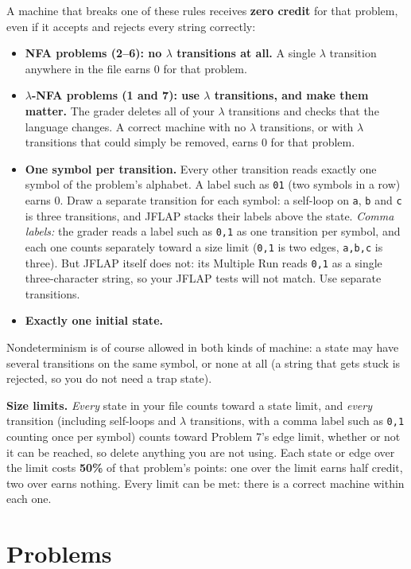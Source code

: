 \documentclass[11pt]{article}
\begin{document}
A machine that breaks one of these rules receives \textbf{zero credit} for that problem, even if
it accepts and rejects every string correctly:
\begin{itemize}
  \item \textbf{NFA problems (2--6): no $\lambda$ transitions at all.} A single $\lambda$
        transition anywhere in the file earns 0 for that problem.
  \item \textbf{$\lambda$-NFA problems (1 and 7): use $\lambda$ transitions, and make them
        matter.} The grader deletes all of your $\lambda$ transitions and checks that the
        language changes. A correct machine with no $\lambda$ transitions, or with $\lambda$
        transitions that could simply be removed, earns 0 for that problem.
  \item \textbf{One symbol per transition.} Every other transition reads exactly one symbol of
        the problem's alphabet. A label such as \texttt{01} (two symbols in a row) earns 0.
        Draw a separate transition for each symbol: a self-loop on \texttt{a}, \texttt{b} and
        \texttt{c} is three transitions, and JFLAP stacks their labels above the state.
        \emph{Comma labels:} the grader reads a label such as \texttt{0,1} as one transition
        per symbol, and each one counts separately toward a size limit (\texttt{0,1} is two
        edges, \texttt{a,b,c} is three). But JFLAP itself does not: its Multiple Run reads
        \texttt{0,1} as a single three-character string, so your JFLAP tests will not match.
        Use separate transitions.
  \item \textbf{Exactly one initial state.}
\end{itemize}
Nondeterminism is of course allowed in both kinds of machine: a state may have several
transitions on the same symbol, or none at all (a string that gets stuck is rejected, so you do
not need a trap state).

\textbf{Size limits.} \emph{Every} state in your file counts toward a state limit, and
\emph{every} transition (including self-loops and $\lambda$ transitions, with a comma label
such as \texttt{0,1} counting once per symbol) counts toward Problem 7's edge limit, whether or not it can be reached, so delete anything you are not using. Each
state or edge over the limit costs \textbf{50\%} of that problem's points: one over the limit
earns half credit, two over earns nothing. Every limit can be met: there is a correct machine
within each one.

\section*{Problems}
\end{document}

